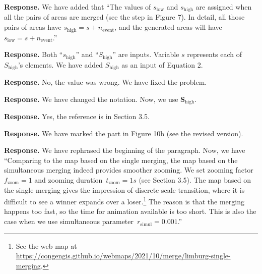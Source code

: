 \documentclass[a4paper,twoside,11pt]{reviewresponse}
\begin{document}
\textbf{Response.}
We have added that
``The values of $s_\mathrm{low}$ and $s_\mathrm{high}$
are assigned when all the pairs of areas are merged
(see the step in Figure 7).
In detail, all those pairs of areas have 
$s_\mathrm{high} = s + n_\mathrm{event}$,
and the generated areas will have 
$s_\mathrm{low} = s + n_\mathrm{event}$.''

\textbf{Response.}
Both ``$s_\mathrm{high}$'' and ``$S_\mathrm{high}$'' are inputs.
Variable $s$ represents each of $S_\mathrm{high}$'s elements.
We have added $S_\mathrm{high}$ as an input of Equation 2.


\textbf{Response.}
No, the value was wrong. We have fixed the problem.

\textbf{Response.}
We have changed the notation. 
Now, we use $\mathrm{\textbf{S}_{high}}$.

\textbf{Response.}
Yes, the reference is in Section 3.5.

\textbf{Response.}
We have marked the part in Figure 10b
(see the revised version).

\textbf{Response.}
We have rephrased the beginning of the paragraph.
Now, we have
``Comparing to the map based on the single merging,
the map based on the simultaneous merging indeed 
provides smoother zooming.
We set zooming factor~$f_\mathrm{zoom}=1$ and 
zooming duration~$t_\mathrm{zoom}=1 s$ 
(see Section 3.5).
The map based on the single merging gives the impression
of discrete scale transition, 
where it is difficult to see a winner expands over a loser.\footnote{%
See the web map at
\url{https://congengis.github.io/webmaps/2021/10/merge/limburg-single-merging}.} 
The reason is that the merging happens too fast,
so the time for animation available is too short.
This is also the case when 
we use simultaneous parameter~$r_\mathrm{simul}= 0.001$.''
\end{document}
